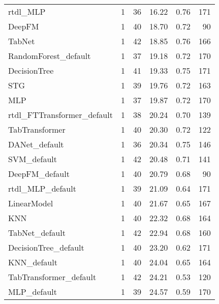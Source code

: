 \begin{tabular}{lrrrrr}
rtdl_MLP                   &            1 &  36 &  16.22 &                     0.76 &   171 \\
DeepFM                     &            1 &  40 &  18.70 &                     0.72 &    90 \\
TabNet                     &            1 &  42 &  18.85 &                     0.76 &   166 \\
RandomForest_default       &            1 &  37 &  19.18 &                     0.72 &   170 \\
DecisionTree               &            1 &  41 &  19.33 &                     0.75 &   171 \\
STG                        &            1 &  39 &  19.76 &                     0.72 &   163 \\
MLP                        &            1 &  37 &  19.87 &                     0.72 &   170 \\
rtdl_FTTransformer_default &            1 &  38 &  20.24 &                     0.70 &   139 \\
TabTransformer             &            1 &  40 &  20.30 &                     0.72 &   122 \\
DANet_default              &            1 &  36 &  20.34 &                     0.75 &   146 \\
SVM_default                &            1 &  42 &  20.48 &                     0.71 &   141 \\
DeepFM_default             &            1 &  40 &  20.79 &                     0.68 &    90 \\
rtdl_MLP_default           &            1 &  39 &  21.09 &                     0.64 &   171 \\
LinearModel                &            1 &  40 &  21.67 &                     0.65 &   167 \\
KNN                        &            1 &  40 &  22.32 &                     0.68 &   164 \\
TabNet_default             &            1 &  42 &  22.94 &                     0.68 &   160 \\
DecisionTree_default       &            1 &  40 &  23.20 &                     0.62 &   171 \\
KNN_default                &            1 &  40 &  24.04 &                     0.65 &   164 \\
TabTransformer_default     &            1 &  42 &  24.21 &                     0.53 &   120 \\
MLP_default                &            1 &  39 &  24.57 &                     0.59 &   170 \\

\end{tabular}
